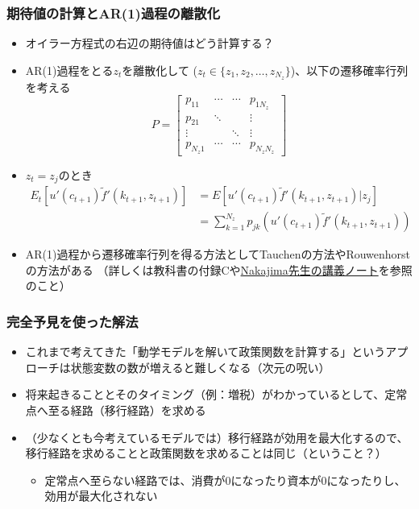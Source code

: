 \documentclass[unicode,9pt]{beamer}%
\begin{document}
\begin{frame}\frametitle{期待値の計算とAR(1)過程の離散化}
  \begin{itemize}
      \item オイラー方程式の右辺の期待値はどう計算する？
      \item AR(1)過程をとる$z_t$を離散化して ($z_t \in \{z_1, z_2, \dots, z_{N_z} \}$)、以下の遷移確率行列を考える
        $$
        P = \begin{bmatrix}
          p_{11} & \cdots & \cdots & p_{1N_z} \\
          p_{21} & \ddots & & \vdots \\
          \vdots & & \ddots & \vdots \\
          p_{N_z1} & \cdots & \cdots & p_{N_zN_z}
        \end{bmatrix}
        $$
      \item $z_t = z_j$のとき
        \begin{align*}
          E_t \left[ u'(c_{t+1}) \tilde{f}'(k_{t+1}, z_{t+1}) \right] 
          &= E \left[u'(c_{t+1}) \tilde{f}'(k_{t+1}, z_{t+1}) | z_j \right] \\
          &= \sum_{k=1}^{N_z} p_{jk} \left( u'(c_{t+1}) \tilde{f}'(k_{t+1}, z_{t+1}) \right) 
        \end{align*}
      \item AR(1)過程から遷移確率行列を得る方法としてTauchenの方法やRouwenhorstの方法がある （詳しくは教科書の付録Cや\href{https://makotonakajima.github.io/homepage/note-num-ar1.pdf}{Nakajima先生の講義ノート}を参照のこと）
  \end{itemize}
\end{frame}


\begin{frame}\frametitle{完全予見を使った解法}
  \begin{itemize}
    \item これまで考えてきた「動学モデルを解いて政策関数を計算する」というアプローチは状態変数の数が増えると難しくなる（次元の呪い）
    \item 将来起きることとそのタイミング（例：増税）がわかっているとして、定常点へ至る経路（移行経路）を求める
      \bigskip
    \item （少なくとも今考えているモデルでは）移行経路が効用を最大化するので、移行経路を求めることと政策関数を求めることは同じ（ということ？）
      \begin{itemize}
          \item 定常点へ至らない経路では、消費が0になったり資本が0になったりし、効用が最大化されない
      \end{itemize}
  \end{itemize}
\end{frame}
\end{document}
